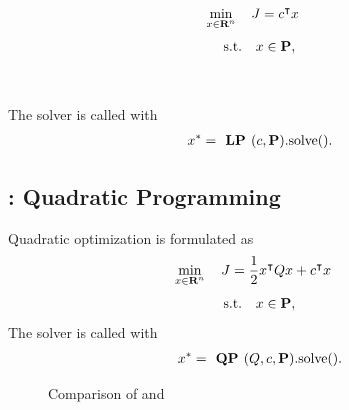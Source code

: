 \documentclass{article}
\begin{document}
    \begin{align*}
        \min_{x\in\textbf{R}^n}\quad
        J
        &=
                c^\intercal x
    \end{align*}
    \begin{align*}
        \text{s.t.}\quad x\in\textbf{P},
    \end{align*}
    \\
    \\
    The solver is called with
    \begin{align*}
        x^* = \textbf{ LP }(c,\textbf{P}).\text{solve()}.
    \end{align*}

\subsection{\QP: Quadratic Programming}

    Quadratic optimization is formulated as \cite[p.~152]{bv_cvxbook}  
    \begin{align*}
        \min_{x\in\textbf{R}^n}\quad
        J
        &=
                \frac{1}{2} x^\intercal Q x
            +
                c^\intercal x
    \end{align*}
    \begin{align*}
        \text{s.t.}\quad x\in\textbf{P},
    \end{align*}
    The solver is called with    
    \begin{align*}
        x^* = \textbf{ QP }(Q,c,\textbf{P}).\text{solve()}.
    \end{align*}

    \begin{figure}[b]
        \centering
        \qquad
        \caption{Comparison of \LP and \QP}%
        \label{fig:LPvsQP}%
    \end{figure}
\end{document}
